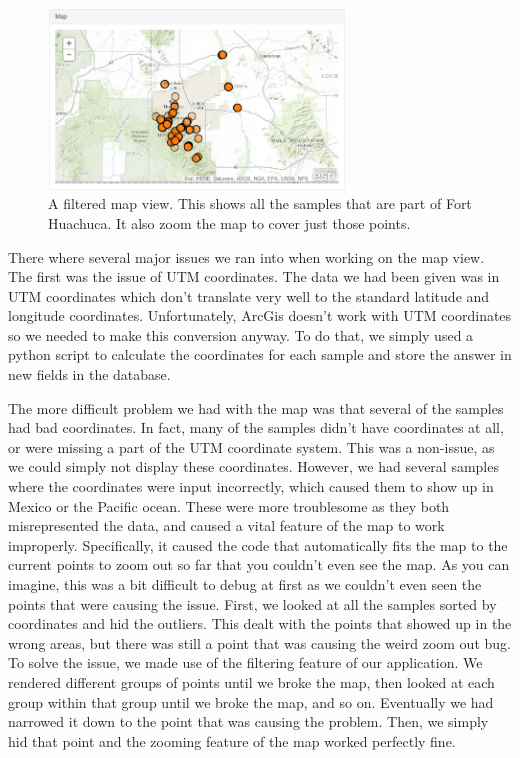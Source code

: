 \documentclass[10pt,draftclsnofoot,onecolumn]{IEEEtran}
\begin{document}
\begin{figure}[h]
	\centering
	\includegraphics[width=0.70\textwidth]{images/filtered_map.png}
	\captionsetup{justification=centering}
	\caption{
		A filtered map view.
		This shows all the samples that are part of Fort Huachuca. It also zoom the map to cover just those points.
	}
	\label{fig:filtered_map}
\end{figure}

There where several major issues we ran into when working on the map view.
The first was the issue of UTM coordinates.
The data we had been given was in UTM coordinates which don't translate very well to the standard latitude and longitude coordinates.
Unfortunately, ArcGis doesn't work with UTM coordinates so we needed to make this conversion anyway.
To do that, we simply used a python script to calculate the coordinates for each sample and store the answer in new fields in the database.

The more difficult problem we had with the map was that several of the samples had bad coordinates.
In fact, many of the samples didn't have coordinates at all, or were missing a part of the UTM coordinate system.
This was a non-issue, as we could simply not display these coordinates.
However, we had several samples where the coordinates were input incorrectly, which caused them to show up in Mexico or the Pacific ocean.
These were more troublesome as they both misrepresented the data, and caused a vital feature of the map to work improperly.
Specifically, it caused the code that automatically fits the map to the current points to zoom out so far that you couldn't even see the map.
As you can imagine, this was a bit difficult to debug at first as we couldn't even seen the points that were causing the issue.
First, we looked at all the samples sorted by coordinates and hid the outliers.
This dealt with the points that showed up in the wrong areas, but there was still a point that was causing the weird zoom out bug.
To solve the issue, we made use of the filtering feature of our application.
We rendered different groups of points until we broke the map, then looked at each group within that group until we broke the map, and so on.
Eventually we had narrowed it down to the point that was causing the problem.
Then, we simply hid that point and the zooming feature of the map worked perfectly fine.
\end{document}

